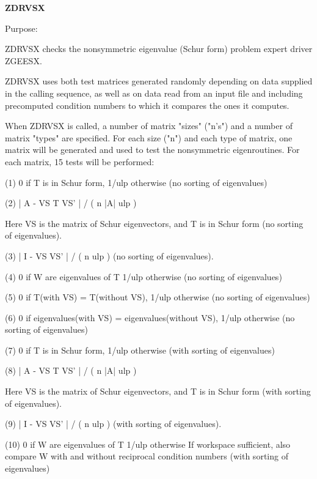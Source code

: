 {\bfseries Z\+D\+R\+V\+S\+X} 

\begin{DoxyParagraph}{Purpose\+: }
\begin{DoxyVerb}    ZDRVSX checks the nonsymmetric eigenvalue (Schur form) problem
    expert driver ZGEESX.

    ZDRVSX uses both test matrices generated randomly depending on
    data supplied in the calling sequence, as well as on data
    read from an input file and including precomputed condition
    numbers to which it compares the ones it computes.

    When ZDRVSX is called, a number of matrix "sizes" ("n's") and a
    number of matrix "types" are specified.  For each size ("n")
    and each type of matrix, one matrix will be generated and used
    to test the nonsymmetric eigenroutines.  For each matrix, 15
    tests will be performed:

    (1)     0 if T is in Schur form, 1/ulp otherwise
           (no sorting of eigenvalues)

    (2)     | A - VS T VS' | / ( n |A| ulp )

      Here VS is the matrix of Schur eigenvectors, and T is in Schur
      form  (no sorting of eigenvalues).

    (3)     | I - VS VS' | / ( n ulp ) (no sorting of eigenvalues).

    (4)     0     if W are eigenvalues of T
            1/ulp otherwise
            (no sorting of eigenvalues)

    (5)     0     if T(with VS) = T(without VS),
            1/ulp otherwise
            (no sorting of eigenvalues)

    (6)     0     if eigenvalues(with VS) = eigenvalues(without VS),
            1/ulp otherwise
            (no sorting of eigenvalues)

    (7)     0 if T is in Schur form, 1/ulp otherwise
            (with sorting of eigenvalues)

    (8)     | A - VS T VS' | / ( n |A| ulp )

      Here VS is the matrix of Schur eigenvectors, and T is in Schur
      form  (with sorting of eigenvalues).

    (9)     | I - VS VS' | / ( n ulp ) (with sorting of eigenvalues).

    (10)    0     if W are eigenvalues of T
            1/ulp otherwise
            If workspace sufficient, also compare W with and
            without reciprocal condition numbers
            (with sorting of eigenvalues)


\end{DoxyVerb}
\end{DoxyParagraph}
